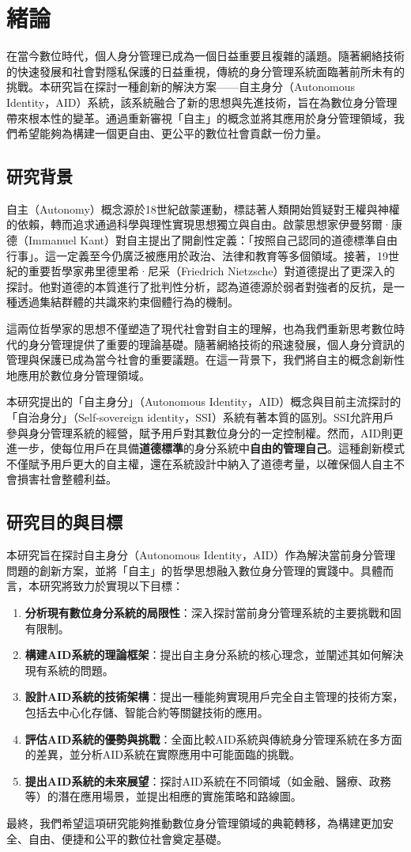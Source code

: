 
\chapter{緒論}
在當今數位時代，個人身分管理已成為一個日益重要且複雜的議題。隨著網絡技術的快速發展和社會對隱私保護的日益重視，傳統的身分管理系統面臨著前所未有的挑戰。本研究旨在探討一種創新的解決方案——自主身分（Autonomous Identity，AID）系統，該系統融合了新的思想與先進技術，旨在為數位身分管理帶來根本性的變革。通過重新審視「自主」的概念並將其應用於身分管理領域，我們希望能夠為構建一個更自由、更公平的數位社會貢獻一份力量。
\section{研究背景}
自主（Autonomy）概念源於18世紀啟蒙運動，標誌著人類開始質疑對王權與神權的依賴，轉而追求通過科學與理性實現思想獨立與自由。啟蒙思想家伊曼努爾·康德（Immanuel Kant）對自主提出了開創性定義：「按照自己認同的道德標準自由行事」。這一定義至今仍廣泛被應用於政治、法律和教育等多個領域。接著，19世紀的重要哲學家弗里德里希·尼采（Friedrich Nietzsche）對道德提出了更深入的探討。他對道德的本質進行了批判性分析，認為道德源於弱者對強者的反抗，是一種透過集結群體的共識來約束個體行為的機制。

這兩位哲學家的思想不僅塑造了現代社會對自主的理解，也為我們重新思考數位時代的身分管理提供了重要的理論基礎。隨著網絡技術的飛速發展，個人身分資訊的管理與保護已成為當今社會的重要議題。在這一背景下，我們將自主的概念創新性地應用於數位身分管理領域。

本研究提出的「自主身分」（Autonomous Identity，AID）概念與目前主流探討的「自治身分」（Self-sovereign identity，SSI）系統有著本質的區別。SSI允許用戶參與身分管理系統的經營，賦予用戶對其數位身分的一定控制權。然而，AID則更進一步，使每位用戶在具備\textbf{道德標準}的身分系統中\textbf{自由的管理自己}。這種創新模式不僅賦予用戶更大的自主權，還在系統設計中納入了道德考量，以確保個人自主不會損害社會整體利益。
\section{研究目的與目標}
本研究旨在探討自主身分（Autonomous Identity，AID）作為解決當前身分管理問題的創新方案，並將「自主」的哲學思想融入數位身分管理的實踐中。具體而言，本研究將致力於實現以下目標：
\begin{enumerate}
  \item \textbf{分析現有數位身分系統的局限性}：深入探討當前身分管理系統的主要挑戰和固有限制。
  \item \textbf{構建AID系統的理論框架}：提出自主身分系統的核心理念，並闡述其如何解決現有系統的問題。
  \item \textbf{設計AID系統的技術架構}：提出一種能夠實現用戶完全自主管理的技術方案，包括去中心化存儲、智能合約等關鍵技術的應用。
  \item \textbf{評估AID系統的優勢與挑戰}：全面比較AID系統與傳統身分管理系統在多方面的差異，並分析AID系統在實際應用中可能面臨的挑戰。
  \item \textbf{提出AID系統的未來展望}：探討AID系統在不同領域（如金融、醫療、政務等）的潛在應用場景，並提出相應的實施策略和路線圖。
\end{enumerate}
最終，我們希望這項研究能夠推動數位身分管理領域的典範轉移，為構建更加安全、自由、便捷和公平的數位社會奠定基礎。
